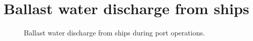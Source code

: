 

\chapter{Ballast water discharge from ships}
\label{cp:ballast}
    \begin{figure}[htbp]
    \centering
    \par\vspace*{1cm}
    
    \caption{Ballast water discharge from ships during port operations.}
    \label{fig:ballast-discharge}
\end{figure}
